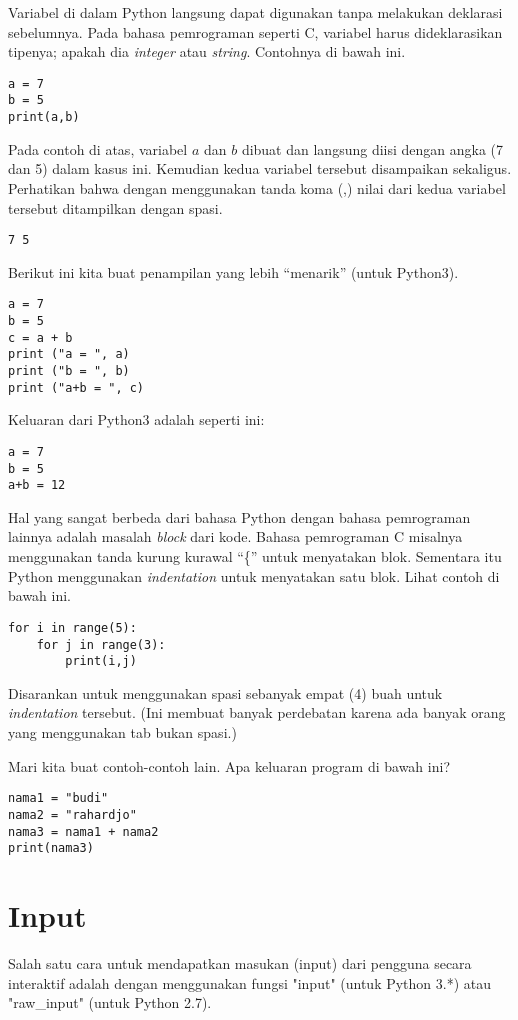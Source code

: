 Variabel di dalam Python langsung dapat digunakan tanpa melakukan deklarasi
sebelumnya. Pada bahasa pemrograman seperti C, variabel harus dideklarasikan
tipenya; apakah dia {\em integer} atau {\em string}.
Contohnya di bawah ini.
\begin{verbatim}
a = 7
b = 5
print(a,b)
\end{verbatim}
Pada contoh di atas, variabel $a$ dan $b$ dibuat dan langsung diisi dengan
angka (7 dan 5) dalam kasus ini.
Kemudian kedua variabel tersebut disampaikan sekaligus.
Perhatikan bahwa dengan menggunakan tanda koma (,) nilai dari kedua variabel
tersebut ditampilkan dengan spasi.

\begin{verbatim}
7 5
\end{verbatim}

Berikut ini kita buat penampilan yang lebih ``menarik'' (untuk Python3).
\begin{verbatim}
a = 7
b = 5
c = a + b
print ("a = ", a)
print ("b = ", b)
print ("a+b = ", c)
\end{verbatim}

Keluaran dari Python3 adalah seperti ini:
\begin{verbatim}
a = 7
b = 5
a+b = 12
\end{verbatim}

Hal yang sangat berbeda dari bahasa Python dengan
bahasa pemrograman lainnya adalah masalah {\em block} dari kode. 
Bahasa pemrograman C misalnya menggunakan tanda kurung kurawal ``\{'' 
untuk menyatakan blok. Sementara itu Python menggunakan {\em indentation} 
untuk menyatakan satu blok. Lihat contoh di bawah ini.

\begin{verbatim}
for i in range(5):
    for j in range(3):
        print(i,j)
\end{verbatim}

Disarankan untuk menggunakan spasi sebanyak empat (4) buah untuk {\em
indentation} tersebut. (Ini membuat banyak perdebatan karena ada banyak orang
yang menggunakan tab bukan spasi.)

Mari kita buat contoh-contoh lain. Apa keluaran program di bawah ini?
\begin{verbatim}
nama1 = "budi"
nama2 = "rahardjo"
nama3 = nama1 + nama2
print(nama3)
\end{verbatim}
    
\section{Input}
Salah satu cara untuk mendapatkan masukan (input) dari pengguna secara
interaktif adalah dengan menggunakan fungsi "input" (untuk Python 3.*)
atau "raw\_input" (untuk Python 2.7).


